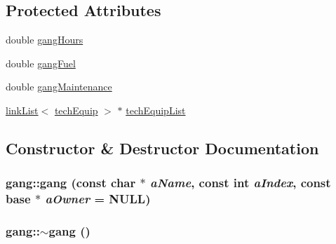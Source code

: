 \subsection*{Protected Attributes}
\begin{DoxyCompactItemize}
\item 
double \hyperlink{classgang_aa4dcaa4f57f2795993a4d9b4257733c4}{gangHours}
\item 
double \hyperlink{classgang_a194b6fd27c1716b1937270669a7957d3}{gangFuel}
\item 
double \hyperlink{classgang_a1b89302ca15faa1cb6d1a281ba3792cc}{gangMaintenance}
\item 
\hyperlink{classlink_list}{linkList}$<$ \hyperlink{classtech_equip}{techEquip} $>$ $\ast$ \hyperlink{classgang_a42b0369cb27b2979e0f038e85339b8b8}{techEquipList}
\end{DoxyCompactItemize}


\subsection{Constructor \& Destructor Documentation}
\hypertarget{classgang_aa992d6dc400e7d4d5b0b8b38f92d97de}{
\subsubsection[{gang}]{\setlength{\rightskip}{0pt plus 5cm}gang::gang (const char $\ast$ {\em aName}, \/  const int {\em aIndex}, \/  const {\bf base} $\ast$ {\em aOwner} = {\ttfamily NULL})}}
\label{classgang_aa992d6dc400e7d4d5b0b8b38f92d97de}
\hypertarget{classgang_af922aa6f04ccfb6357dd2037ec1ff928}{
\subsubsection[{$\sim$gang}]{\setlength{\rightskip}{0pt plus 5cm}gang::$\sim$gang ()}}
\label{classgang_af922aa6f04ccfb6357dd2037ec1ff928}



